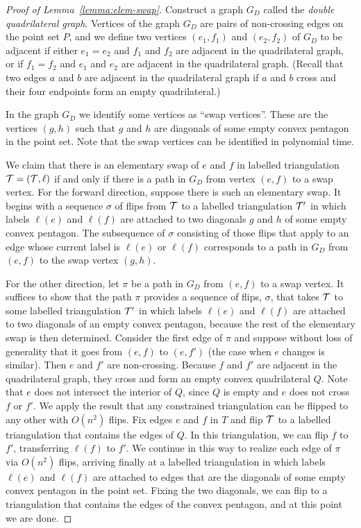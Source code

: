 \begin{proof}[Proof of Lemma~\ref{lemma:elem-swap}]
Construct a graph $G_D$ called the \emph{double quadrilateral graph}. 
Vertices of the graph $G_D$ are
pairs of non-crossing edges on the point set $P$, and we define two vertices
$(e_{1},f_{1})$ and $(e_{2},f_{2})$ of $G_D$ to be adjacent
if either $e_{1}=e_{2}$ and $f_{1}$ and $f_{2}$
are adjacent in the quadrilateral graph, 
or if $f_{1}=f_{2}$ and $e_{1}$ and $e_{2}$
are adjacent in the quadrilateral graph.
(Recall that two edges $a$ and $b$ are adjacent in the quadrilateral graph if $a$ and $b$ cross and their four endpoints form an empty quadrilateral.)

In the graph $G_D$ we identify some vertices as ``swap vertices''.  These are the vertices $(g,h)$ such that $g$ and $h$ are diagonals of some empty convex pentagon in the point set. 
Note that the swap vertices can be identified in polynomial time.

We claim that  there is an elementary swap of $e$ and $f$ in labelled triangulation $\cal T = (T,\ell)$  if and only if there is a path in $G_D$ from vertex $(e,f)$ to a swap vertex.  
For the forward direction, suppose there is such an elementary swap.
It begins with a sequence $\sigma$ of flips from $\cal T$ to a labelled triangulation ${\cal T}'$ in which
labels $\ell(e)$ and $\ell(f)$ are attached to two diagonals $g$ and $h$ of some empty convex pentagon.
The subsequence of $\sigma$ consisting of those flips that apply to an edge whose current label is $\ell(e)$ or $\ell(f)$ corresponds to a path in $G_D$ from $(e,f)$ to the swap vertex $(g,h)$.

For the other direction, let $\pi$ be a path in $G_D$ from $(e,f)$ to a swap vertex.  
It suffices to show that the path $\pi$ provides a sequence of flips, $\sigma$, that takes $\cal T$ to some labelled triangulation ${\cal T}'$ in which
labels $\ell(e)$ and $\ell(f)$ are attached to two diagonals of an empty convex pentagon,
because the rest of the elementary swap is then determined.  
Consider the first edge of $\pi$ and suppose without loss of generality that it goes from $(e,f)$ to $(e,f')$ (the case when $e$ changes is similar).   Then $e$ and $f'$ are non-crossing.  Because $f$ and $f'$ are adjacent in the quadrilateral graph, they cross and form an empty convex quadrilateral $Q$.
Note that $e$ does not intersect the interior of $Q$, since $Q$ is empty and $e$ does not cross $f$ or $f'$.
We apply the result that any constrained triangulation can be  flipped to any other with $O(n^2)$ flips.  Fix edges $e$ and $f$ in $T$ and flip $\cal T$ to a labelled triangulation that contains the edges of $Q$.  In this triangulation, we can flip $f$ to $f'$, transferring $\ell(f)$ to $f'$.  We continue in this way to realize each edge of $\pi$ via $O(n^2)$ flips, arriving finally at a labelled triangulation in which labels $\ell(e)$ and $\ell(f)$ are attached to edges that are the diagonals of some empty convex pentagon in the point set.  Fixing the two diagonals, we can flip to a triangulation that contains the edges of the convex pentagon, and at this point we are done.      


\end{proof}
